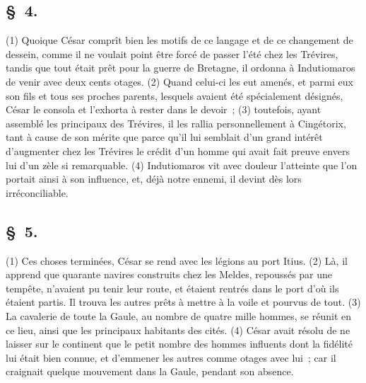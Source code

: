 \documentclass[french,twoside]{book} %
\begin{document}
\subsection[{§ 4.}]{ \textsc{§ 4.} }
\noindent (1) Quoique César comprît bien les motifs de ce langage et de ce changement de dessein, comme il ne voulait point être forcé de passer l’été chez les Trévires, tandis que tout était prêt pour la guerre de Bretagne, il ordonna à Indutiomaros de venir avec deux cents otages. (2) Quand celui-ci les eut amenés, et parmi eux son fils et tous ses proches parents, lesquels avaient été spécialement désignés, César le consola et l’exhorta à rester dans le devoir ; (3) toutefois, ayant assemblé les principaux des Trévires, il les rallia personnellement à Cingétorix, tant à cause de son mérite que parce qu’il lui semblait d’un grand intérêt d’augmenter chez les Trévires le crédit d’un homme qui avait fait preuve envers lui d’un zèle si remarquable. (4) Indutiomaros vit avec douleur l’atteinte que l’on portait ainsi à son influence, et, déjà notre ennemi, il devint dès lors irréconciliable.
\subsection[{§ 5.}]{ \textsc{§ 5.} }
\noindent (1) Ces choses terminées, César se rend avec les légions au port Itius. (2) Là, il apprend que quarante navires construits chez les Meldes, repoussés par une tempête, n’avaient pu tenir leur route, et étaient rentrés dans le port d’où ils étaient partis. Il trouva les autres prêts à mettre à la voile et pourvus de tout. (3) La cavalerie de toute la Gaule, au nombre de quatre mille hommes, se réunit en ce lieu, ainsi que les principaux habitants des cités. (4) César avait résolu de ne laisser sur le continent que le petit nombre des hommes influents dont la fidélité lui était bien connue, et d’emmener les autres comme otages avec lui ; car il craignait quelque mouvement dans la Gaule, pendant son absence.
\end{document}
